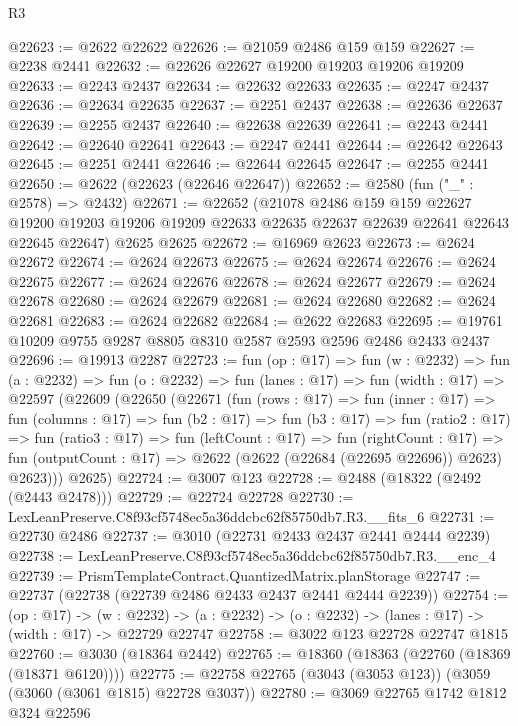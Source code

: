 \begin{lexlean}{R3}
\begin{coremodule}
@22623 := @2622 @22622
@22626 := @21059 @2486 @159 @159
@22627 := @2238 @2441
@22632 := @22626 @22627 @19200 @19203 @19206 @19209
@22633 := @2243 @2437
@22634 := @22632 @22633
@22635 := @2247 @2437
@22636 := @22634 @22635
@22637 := @2251 @2437
@22638 := @22636 @22637
@22639 := @2255 @2437
@22640 := @22638 @22639
@22641 := @2243 @2441
@22642 := @22640 @22641
@22643 := @2247 @2441
@22644 := @22642 @22643
@22645 := @2251 @2441
@22646 := @22644 @22645
@22647 := @2255 @2441
@22650 := @2622 (@22623 (@22646 @22647))
@22652 := @2580 (fun ("_" : @2578) => @2432)
@22671 := @22652
    (@21078
      @2486
      @159
      @159
      @22627
      @19200
      @19203
      @19206
      @19209
      @22633
      @22635
      @22637
      @22639
      @22641
      @22643
      @22645
      @22647)
    @2625
    @2625
@22672 := @16969 @2623
@22673 := @2624 @22672
@22674 := @2624 @22673
@22675 := @2624 @22674
@22676 := @2624 @22675
@22677 := @2624 @22676
@22678 := @2624 @22677
@22679 := @2624 @22678
@22680 := @2624 @22679
@22681 := @2624 @22680
@22682 := @2624 @22681
@22683 := @2624 @22682
@22684 := @2622 @22683
@22695 := @19761 @10209 @9755 @9287 @8805 @8310 @2587 @2593 @2596 @2486 @2433 @2437
@22696 := @19913 @2287
@22723 := fun (op : @17) =>
  fun (w : @2232) =>
  fun (a : @2232) =>
  fun (o : @2232) =>
  fun (lanes : @17) =>
  fun (width : @17) =>
  @22597
    (@22609
      (@22650
        (@22671
          (fun (rows : @17) =>
          fun (inner : @17) =>
          fun (columns : @17) =>
          fun (b2 : @17) =>
          fun (b3 : @17) =>
          fun (ratio2 : @17) =>
          fun (ratio3 : @17) =>
          fun (leftCount : @17) =>
          fun (rightCount : @17) =>
          fun (outputCount : @17) => @2622 (@2622 (@22684 (@22695 @22696)) @2623) @2623)))
      @2625)
@22724 := @3007 @123
@22728 := @2488 (@18322 (@2492 (@2443 @2478)))
@22729 := @22724 @22728
@22730 := LexLeanPreserve.C8f93cf5748ec5a36ddcbc62f85750db7.R3.__fits_6
@22731 := @22730 @2486
@22737 := @3010 (@22731 @2433 @2437 @2441 @2444 @2239)
@22738 := LexLeanPreserve.C8f93cf5748ec5a36ddcbc62f85750db7.R3.__enc_4
@22739 := PrismTemplateContract.QuantizedMatrix.planStorage
@22747 := @22737 (@22738 (@22739 @2486 @2433 @2437 @2441 @2444 @2239))
@22754 := (op : @17) ->
  (w : @2232) -> (a : @2232) -> (o : @2232) -> (lanes : @17) -> (width : @17) -> @22729 @22747
@22758 := @3022 @123 @22728 @22747 @1815
@22760 := @3030 (@18364 @2442)
@22765 := @18360 (@18363 (@22760 (@18369 (@18371 @6120))))
@22775 := @22758 @22765 (@3043 (@3053 @123)) (@3059 (@3060 (@3061 @1815) @22728 @3037))
@22780 := @3069 @22765 @1742 @1812 @324 @22596

\end{coremodule}
\end{lexlean}
